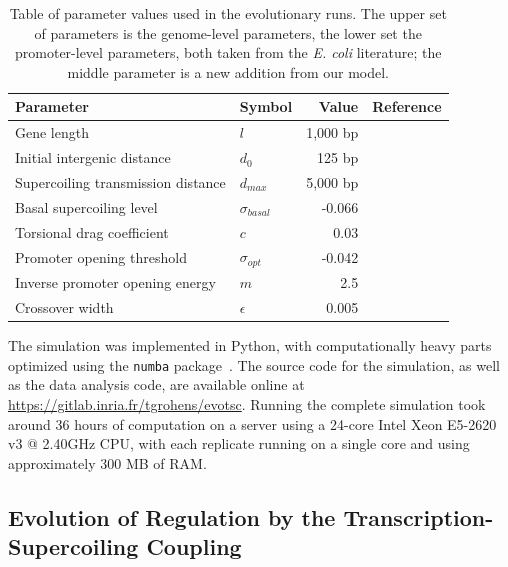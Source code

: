 \begin{table}[H]
  \begin{center}
    \begin{tabular}{ l  l  r  c }
    \toprule
    \textbf{Parameter} & \textbf{Symbol} & \textbf{Value} & \textbf{Reference} \\
    \midrule
    Gene length & $l$ & 1,000 bp & \cite{blattner1997} \\
    Initial intergenic distance & $d_0$ & 125 bp & \cite{blattner1997} \\
    Supercoiling transmission distance & $d_{max}$ & 5,000 bp & \cite{klein2021} \\
    Basal supercoiling level & $\sigma_{basal}$ & -0.066 & \cite{crozat2005} \\
    \midrule
    Torsional drag coefficient & $c$ & 0.03 & \\
    \midrule
    Promoter opening threshold & $\sigma_{opt}$ & -0.042 & \cite{elhoudaigui2019} \\
    Inverse promoter opening energy & $m$ & 2.5 & \cite{elhoudaigui2019} \\
    Crossover width & $\epsilon$ & 0.005 & \cite{elhoudaigui2019} \\
    \bottomrule
    \end{tabular}
    \end{center}
  \caption[Table of parameter values used for the advanced \emph{EvoTSC} runs]{Table of parameter values used in the evolutionary runs.
  The upper set of parameters is the genome-level parameters, the lower set the promoter-level parameters, both taken from the \emph{E. coli} literature; the middle parameter is a new addition from our model.}
  \label{tab:param_values}
\end{table}

The simulation was implemented in Python, with computationally heavy parts optimized using the \texttt{numba} package~\citep{lam2015}. The source code for the simulation, as well as the data analysis code, are available online at \url{https://gitlab.inria.fr/tgrohens/evotsc}.
Running the complete simulation took around 36 hours of computation on a server using a 24-core Intel Xeon E5-2620 v3 @ 2.40GHz CPU, with each replicate running on a single core and using approximately 300 MB of RAM.

\subsection{Evolution of Regulation by the Transcription-Supercoiling Coupling}

